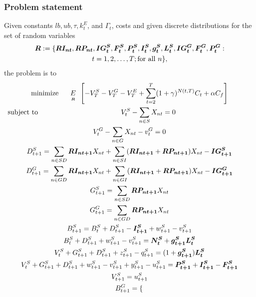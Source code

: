 \subsubsection{Problem statement}
\label{RY:probsec}
Given constants $lb, ub, \tau, k^E_t$, and $\Gamma_t$, costs  and given discrete distributions for the set of random variables 
\begin{multline*}
\mathbf{\boldsymbol{R}}:=\{\mathbf{\boldsymbol{RI_{nt}}}, \mathbf{\boldsymbol{RP_{nt}}}, \mathbf{\boldsymbol{IG^S_{t}}}, \mathbf{\boldsymbol{F^S_t}}, \mathbf{\boldsymbol{P^S_t}}, \mathbf{\boldsymbol{I^S_t}}, \mathbf{\boldsymbol{g^S_t}}, \mathbf{\boldsymbol{L^S_t}}, \mathbf{\boldsymbol{IG^G_t}}, \mathbf{\boldsymbol{F^G_t}}, \mathbf{\boldsymbol{P^G_t}}:\\ 
t=1,2,\ldots,T; \mbox{for all } n\},
\end{multline*}
the problem is to
{\allowdisplaybreaks
\begin{gather}
\mbox{minimize }\hspace{3mm}\expect[R]\left[-V^S_T - V^G_T - V^E_T + \sum_{t=2}^{T} (1+\gamma)^{N(t,T)} C_t + \alpha C_f\right] \label{RY:obj}\\
\mbox{subject to }\hspace{1.6in} V^S_t - \sum_{n\in S} X_{nt} = 0\hspace{1.5in}\notag\\
V^G_t - \sum_{n \in G} X_{nt} - v_t^G = 0\notag\\
D_{t+1}^S = \sum_{n\in SD} \rand{RI_{nt+1}} X_{nt} + \sum_{n\in SI}(\rand{RI_{nt+1}} + \rand{RP_{nt+1}}) X_{nt} - \rand{IG^S_{t+1}}\notag\\
D_{t+1}^G = \sum_{n\in GD} \rand{RI_{nt+1}} X_{nt} + \sum_{n\in GI}(\rand{RI_{nt+1}} + \rand{RP_{nt+1}}) X_{nt} - \rand{IG^G_{t+1}}\notag\\
G_{t+1}^S = \sum_{n\in SD} \rand{RP_{nt+1}} X_{nt}\notag\\
G_{t+1}^G = \sum_{n\in GD} \rand{RP_{nt+1}} X_{nt}\notag\\
B_{t+1}^S = B_t^S + D_{t+1}^S -\rand{I_{t+1}^S} + w_{t+1}^S - v_{t+1}^S\notag\\
B_t^S + D_{t+1}^S + w_{t+1}^S - v_{t+1}^S = \rand{N_t^S} + \rand{g_{t+1}^S} \rand{L_t^S}\notag\\
V_t^S + G_{t+1}^S + D_{t+1}^S + z_{t+1}^S - q_{t+1}^S = (1+\rand{g_{t+1}^S}) \rand{L_t^S}\notag\\
V^S_t + G^S_{t+1} + D^S_{t+1} + w^S_{t+1} - v^S_{t+1} + y^S_{t+1} - u^S_{t+1} = \rand{P^S_{t+1}} + \rand{I^S_{t+1}} - \rand{F^S_{t+1}} \label{RY:gs}\\
V^S_{t+1} = u^S_{t+1} \label{RY:vs}\\
B^G_{t+1}= 
\begin{cases}

\end{cases}
\end{gather}}
